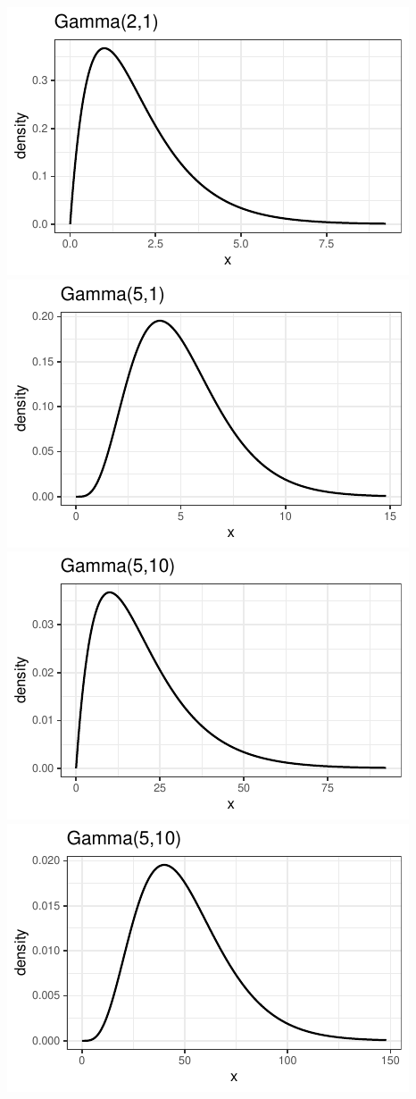 \documentclass[twoside]{book}\usepackage[]{graphicx}\usepackage[]{xcolor}
\makeatletter
\def\maxwidth{ %
  \ifdim\Gin@nat@width>\linewidth
    \linewidth
  \else
    \Gin@nat@width
  \fi
}
\newenvironment{knitrout}{}{} %
\makeatother
\begin{document}
\begin{knitrout}
{\centering \includegraphics[width=\maxwidth]{figures/fig-unnamed-chunk-80-1} 
\includegraphics[width=\maxwidth]{figures/fig-unnamed-chunk-80-2} 
\includegraphics[width=\maxwidth]{figures/fig-unnamed-chunk-80-3} 
\includegraphics[width=\maxwidth]{figures/fig-unnamed-chunk-80-4} 

}
\end{knitrout}
\end{document}
